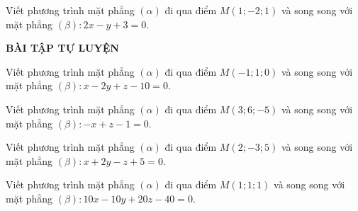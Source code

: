 \begin{vd}%
Viết phương trình mặt phẳng $(\alpha)$ đi qua điểm $M\left(1;-2;1\right)$ và song song với mặt phẳng $(\beta): 2x-y+3=0$.
\end{vd}

\begin{center}
    \textbf{BÀI TẬP TỰ LUYỆN}
\end{center}

\begin{bt}%
Viết phương trình mặt phẳng $(\alpha)$ đi qua điểm $M\left(-1;1;0\right)$ và song song với mặt phẳng $(\beta): x-2y+z-10=0$.
\end{bt}

\begin{bt}%
Viết phương trình mặt phẳng $(\alpha)$ đi qua điểm $M\left(3;6;-5\right)$ và song song với mặt phẳng $(\beta): -x+z-1=0$.
\end{bt}

\begin{bt}%
Viết phương trình mặt phẳng $(\alpha)$ đi qua điểm $M\left(2;-3;5\right)$ và song song với mặt phẳng $(\beta): x+2y-z+5=0$.
\end{bt}

\begin{bt}%
    Viết phương trình mặt phẳng $(\alpha)$ đi qua điểm $M\left(1;1;1\right)$ và song song với mặt phẳng $(\beta): 10x-10y+20z-40=0$.
\end{bt}

